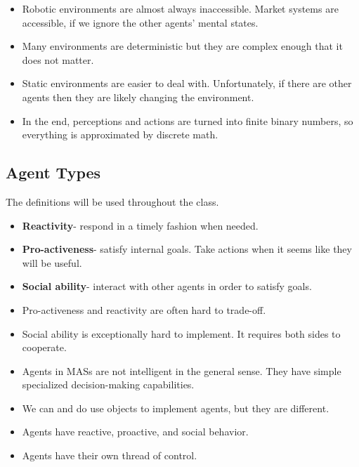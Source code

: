   \begin{itemize}
  \item Robotic environments are almost always
    inaccessible. Market systems are accessible, if we ignore the
    other agents' mental states. 
    
  \item Many environments are deterministic but they are complex
    enough that it does not matter. 
    
  \item Static environments are easier to deal with. Unfortunately,
    if there are other agents then they are likely changing the
    environment. 
    
  \item In the end, perceptions and actions are turned into finite
    binary numbers, so everything is approximated by discrete
    math. 
  \end{itemize}

\subsection{Agent Types}
\label{sec:agent-types}

The definitions will be used throughout the class.

  \begin{itemize}
  \item \textbf{Reactivity}- respond in a timely fashion when
    needed.
    
  \item \textbf{Pro-activeness}- satisfy internal goals. Take actions
    when it seems like they will be useful. 

  \item \textbf{Social ability}- interact with other agents in order
    to satisfy goals. 
    
  \item Pro-activeness and reactivity are often hard to
    trade-off. 
    
  \item Social ability is exceptionally hard to implement. It
    requires both sides to cooperate. 
    
  \item Agents in MASs are not intelligent in the general sense. They
    have simple specialized decision-making capabilities.
  \end{itemize}

  \begin{itemize}
  \item We can and do use objects to implement agents, but they are different.
    
  \item Agents have reactive, proactive, and social behavior. 
    
  \item Agents have their own thread of control. 
  \end{itemize}

